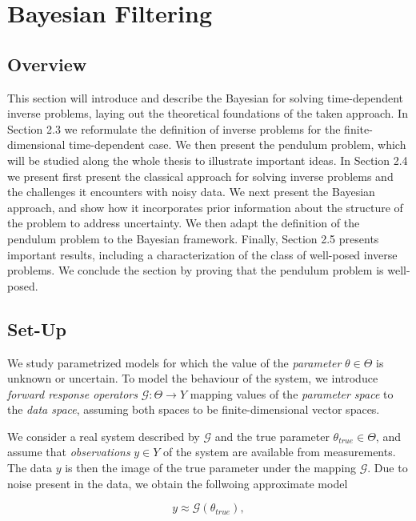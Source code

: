 \section{Bayesian Filtering}
\subsection{Overview}

This section will introduce and describe the Bayesian for solving time-dependent inverse problems, laying out the theoretical foundations of the taken approach. In Section 2.3 we reformulate the definition of inverse problems for the finite-dimensional time-dependent case. We then present the pendulum problem, which will be studied along the whole thesis to illustrate important ideas. In Section 2.4 we present first present the classical approach for solving inverse problems and the challenges it encounters with noisy data. We next present the Bayesian approach, and show how it incorporates prior information about the structure of the problem to address uncertainty. We then adapt the definition of the pendulum problem to the Bayesian framework. Finally, Section 2.5 presents important results, including a characterization of the class of well-posed inverse problems. We conclude the section by proving that the pendulum problem is well-posed.

\subsection{Set-Up}

We study parametrized models for which the value of the \textit{parameter} $\theta \in \Theta$ is unknown or uncertain. To model the behaviour of the system, we introduce \textit{forward response operators} $\mathcal{G} : \Theta \rightarrow Y$ mapping values of the \textit{parameter space} to the \textit{data space}, assuming both spaces to be finite-dimensional vector spaces.

We consider a real system described by $\mathcal{G}$ and the true parameter $\theta_{true} \in \Theta$, and assume that \textit{observations} $y \in Y$ of the system are available from measurements. The data $y$ is then the image of the true parameter under the mapping $\mathcal{G}$. Due to noise present in the data, we obtain the follwoing approximate model

\begin{equation}\label{inverse-formula}
  y \approx \mathcal{G}(\theta_{true}),
\end{equation}

